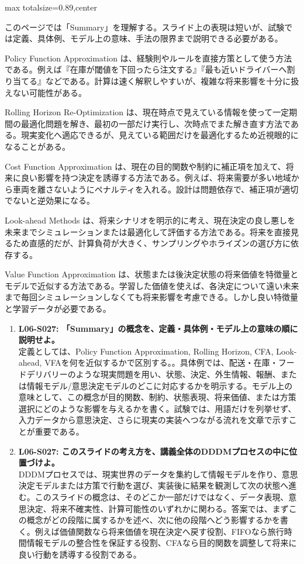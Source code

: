 \begin{minipage}[t]{0.58\textwidth}
\begin{adjustbox}{max totalsize={\textwidth}{0.89\textheight},center}
\begin{minipage}{\textwidth}\scriptsize
{}このページでは「Summary」を理解する。スライド上の表現は短いが、試験では定義、具体例、モデル上の意味、手法の限界まで説明できる必要がある。\par
Policy Function Approximation は、経験則やルールを直接方策として使う方法である。例えば『在庫が閾値を下回ったら注文する』『最も近いドライバーへ割り当てる』などである。計算は速く解釈しやすいが、複雑な将来影響を十分に扱えない可能性がある。\par
Rolling Horizon Re-Optimization は、現在時点で見えている情報を使って一定期間の最適化問題を解き、最初の一部だけ実行し、次時点でまた解き直す方法である。現実変化へ適応できるが、見えている範囲だけを最適化するため近視眼的になることがある。\par
Cost Function Approximation は、現在の目的関数や制約に補正項を加えて、将来に良い影響を持つ決定を誘導する方法である。例えば、将来需要が多い地域から車両を離さないようにペナルティを入れる。設計は問題依存で、補正項が適切でないと逆効果になる。\par
Look-ahead Methods は、将来シナリオを明示的に考え、現在決定の良し悪しを未来までシミュレーションまたは最適化して評価する方法である。将来を直接見るため直感的だが、計算負荷が大きく、サンプリングやホライズンの選び方に依存する。\par
Value Function Approximation は、状態または後決定状態の将来価値を特徴量とモデルで近似する方法である。学習した価値を使えば、各決定について遠い未来まで毎回シミュレーションしなくても将来影響を考慮できる。しかし良い特徴量と学習データが必要である。\par{}\begin{enumerate}\item \textbf{L06-S027: 「Summary」の概念を、定義・具体例・モデル上の意味の順に説明せよ。}\\定義としては、Policy Function Approximation, Rolling Horizon, CFA, Look-ahead, VFAを何を近似するかで区別する。。具体例では、配送・在庫・フードデリバリーのような現実問題を用い、状態、決定、外生情報、報酬、または情報モデル/意思決定モデルのどこに対応するかを明示する。モデル上の意味として、この概念が目的関数、制約、状態表現、将来価値、または方策選択にどのような影響を与えるかを書く。試験では、用語だけを列挙せず、入力データから意思決定、さらに現実の実装へつながる流れを文章で示すことが重要である。\item \textbf{L06-S027: このスライドの考え方を、講義全体のDDDMプロセスの中に位置づけよ。}\\DDDMプロセスでは、現実世界のデータを集約して情報モデルを作り、意思決定モデルまたは方策で行動を選び、実装後に結果を観測して次の状態へ進む。このスライドの概念は、そのどこか一部だけではなく、データ表現、意思決定、将来不確実性、計算可能性のいずれかに関わる。答案では、まずこの概念がどの段階に属するかを述べ、次に他の段階へどう影響するかを書く。例えば価値関数なら将来価値を現在決定へ戻す役割、FIFOなら旅行時間情報モデルの整合性を保証する役割、CFAなら目的関数を調整して将来に良い行動を誘導する役割である。\end{enumerate}

\end{minipage}
\end{adjustbox}
\end{minipage}
